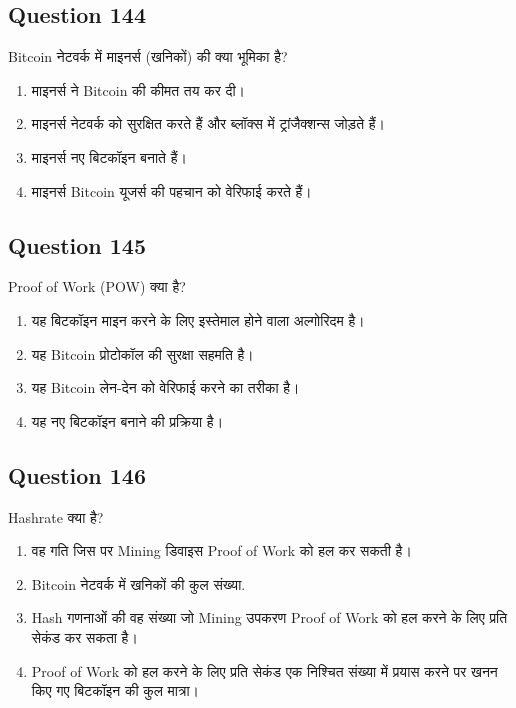 \documentclass[12pt,a4paper]{article}
\begin{document}
\bigskip


\subsection*{Question 144}
Bitcoin नेटवर्क में माइनर्स (खनिकों) की क्या भूमिका है?

\begin{enumerate}[label=\Alph*., leftmargin=*]
\item माइनर्स ने Bitcoin की कीमत तय कर दी।
\item माइनर्स नेटवर्क को सुरक्षित करते हैं और ब्लॉक्स में ट्रांजैक्शन्स जोड़ते हैं।
\item माइनर्स नए बिटकॉइन बनाते हैं।
\item माइनर्स Bitcoin यूजर्स की पहचान को वेरिफाई करते हैं।
\end{enumerate}

\bigskip


\subsection*{Question 145}
Proof of Work (POW) क्या है?

\begin{enumerate}[label=\Alph*., leftmargin=*]
\item यह बिटकॉइन माइन करने के लिए इस्तेमाल होने वाला अल्गोरिदम है।
\item यह Bitcoin प्रोटोकॉल की सुरक्षा सहमति है।
\item यह Bitcoin लेन-देन को वेरिफाई करने का तरीका है।
\item यह नए बिटकॉइन बनाने की प्रक्रिया है।
\end{enumerate}

\bigskip


\subsection*{Question 146}
Hashrate क्या है?

\begin{enumerate}[label=\Alph*., leftmargin=*]
\item वह गति जिस पर Mining डिवाइस Proof of Work को हल कर सकती है।
\item Bitcoin नेटवर्क में खनिकों की कुल संख्या.
\item Hash गणनाओं की वह संख्या जो Mining उपकरण Proof of Work को हल करने के लिए प्रति सेकंड कर सकता है।
\item Proof of Work को हल करने के लिए प्रति सेकंड एक निश्चित संख्या में प्रयास करने पर खनन किए गए बिटकॉइन की कुल मात्रा।
\end{enumerate}
\end{document}
